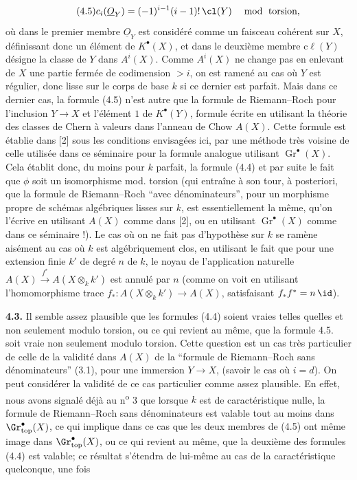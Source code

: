 
\begin{equation}\tag{4.5}
 c_i(\underline{O}_Y)=(-1)^{i-1}(i-1)!\,\cl(Y)\quad \bmod
\text{ torsion},
\end{equation}
où dans le premier membre $\underline{O}_Y$ est considéré comme un faisceau cohérent sur $X$, définissant donc un élément de $K^\bullet(X)$, et dans le deuxième membre $\mathrm{c}\ell(Y)$ désigne la classe de $Y$ dans $A^i(X)$. Comme $A^i(X)$ ne change pas en enlevant de $X$ une partie fermée de codimension $>i$, on est ramené au cas où $Y$ est régulier, donc lisse sur le corps de base $k$ si ce dernier est parfait. Mais dans ce dernier cas, la formule (4.5) n'est autre que la formule de Riemann--Roch pour l'inclusion $Y\to X$ et l'élément $1$ de $K^\bullet(Y)$, formule écrite en utilisant la théorie des classes de Chern à valeurs dans l'anneau de Chow $A(X)$. Cette formule est établie dans [2] sous les conditions envisagées ici, par une méthode très voisine de celle utilisée dans ce séminaire pour la formule analogue utilisant $\operatorname{Gr}^\bullet(X)$. Cela établit donc, du moins pour $k$ parfait, la formule (4.4) et par suite le fait que $\phi$ soit un isomorphisme mod. torsion (qui entraîne à son tour, à posteriori, que la formule de Riemann--Roch ``avec dénominateurs'', pour un morphisme propre de schémas algébriques lisses sur $k$, est essentiellement la même, qu'on l'écrive en utilisant $A(X)$ comme dans [2], ou en utilisant $\operatorname{Gr}^\bullet(X)$ comme dans ce séminaire !). Le cas où on ne fait pas d'hypothèse sur $k$ se ramène aisément au cas où $k$ est algébriquement clos, en utilisant le fait que pour une extension finie $k'$ de degré $n$ de $k$, le noyau de l'application naturelle $A(X)\xrightarrow{f^*}A(X\otimes_k k')$ est annulé par $n$ (comme on voit en utilisant l'homomorphisme trace $f_*:A(X\otimes_k k')\to A(X)$, satisfaisant $f_*f^*=n\,\id$).

\textbf{4.3.} Il semble assez plausible que les formules (4.4) soient vraies telles quelles et non seulement modulo torsion, ou ce qui revient au même, que la formule 4.5. soit vraie non seulement modulo torsion. Cette question est un cas très particulier de celle de la validité dans $A(X)$ de la ``formule de Riemann--Roch sans dénominateurs'' (3.1), pour une immersion $Y\to X$, (savoir le cas où $i=d$). On peut considérer la validité de ce cas particulier comme assez plausible. En effet, nous avons signalé déjà au n\textsuperscript{o} 3 que lorsque $k$ est de caractéristique nulle, la formule de Riemann--Roch sans dénominateurs est valable tout au moins dans $\Gr^{\bullet}_{\mathrm{top}}(X)$, ce qui implique dans ce cas que les deux membres de (4.5) ont même image dans $\Gr^{\bullet}_{\mathrm{top}}(X)$, ou ce qui revient au même, que la deuxième des formules (4.4) est valable; ce résultat s'étendra de lui-même au cas de la caractéristique quelconque, une fois 
